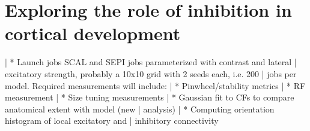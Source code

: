 \chapter{Exploring the role of inhibition in cortical development}

|  * Launch jobs SCAL and SEPI jobs parameterized with contrast and lateral 
|  excitatory strength, probably a 10x10 grid with 2 seeds each, i.e. 200 
|  jobs per model. Required measurements will include:
|       * Pinwheel/stability metrics
|       * RF measurement
|       * Size tuning measurements
|       * Gaussian fit to CFs to compare anatomical extent with model (new 
|  analysis)
|       * Computing orientation histogram of local excitatory and 
|  inhibitory connectivity
